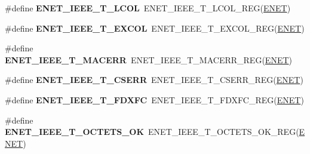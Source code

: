 \begin{DoxyCompactItemize}
\item 
\#define {\bfseries E\+N\+E\+T\+\_\+\+I\+E\+E\+E\+\_\+\+T\+\_\+\+L\+C\+OL}~E\+N\+E\+T\+\_\+\+I\+E\+E\+E\+\_\+\+T\+\_\+\+L\+C\+O\+L\+\_\+\+R\+EG(\hyperlink{group__ENET__Peripheral__Access__Layer_ga4745105f505f3ab949d6a57fbe2a0ed5}{E\+N\+ET})\hypertarget{group__ENET__Register__Accessor__Macros_ga910889e1ce4ca3cb9c3cb3cca360c9a9}{}\label{group__ENET__Register__Accessor__Macros_ga910889e1ce4ca3cb9c3cb3cca360c9a9}

\item 
\#define {\bfseries E\+N\+E\+T\+\_\+\+I\+E\+E\+E\+\_\+\+T\+\_\+\+E\+X\+C\+OL}~E\+N\+E\+T\+\_\+\+I\+E\+E\+E\+\_\+\+T\+\_\+\+E\+X\+C\+O\+L\+\_\+\+R\+EG(\hyperlink{group__ENET__Peripheral__Access__Layer_ga4745105f505f3ab949d6a57fbe2a0ed5}{E\+N\+ET})\hypertarget{group__ENET__Register__Accessor__Macros_gac4beb3a2331f2a6497df362de43e3072}{}\label{group__ENET__Register__Accessor__Macros_gac4beb3a2331f2a6497df362de43e3072}

\item 
\#define {\bfseries E\+N\+E\+T\+\_\+\+I\+E\+E\+E\+\_\+\+T\+\_\+\+M\+A\+C\+E\+RR}~E\+N\+E\+T\+\_\+\+I\+E\+E\+E\+\_\+\+T\+\_\+\+M\+A\+C\+E\+R\+R\+\_\+\+R\+EG(\hyperlink{group__ENET__Peripheral__Access__Layer_ga4745105f505f3ab949d6a57fbe2a0ed5}{E\+N\+ET})\hypertarget{group__ENET__Register__Accessor__Macros_ga38b6b791435ad388824e6a0a20637452}{}\label{group__ENET__Register__Accessor__Macros_ga38b6b791435ad388824e6a0a20637452}

\item 
\#define {\bfseries E\+N\+E\+T\+\_\+\+I\+E\+E\+E\+\_\+\+T\+\_\+\+C\+S\+E\+RR}~E\+N\+E\+T\+\_\+\+I\+E\+E\+E\+\_\+\+T\+\_\+\+C\+S\+E\+R\+R\+\_\+\+R\+EG(\hyperlink{group__ENET__Peripheral__Access__Layer_ga4745105f505f3ab949d6a57fbe2a0ed5}{E\+N\+ET})\hypertarget{group__ENET__Register__Accessor__Macros_ga21185b524641acfbeb1f2c5f1c7231bc}{}\label{group__ENET__Register__Accessor__Macros_ga21185b524641acfbeb1f2c5f1c7231bc}

\item 
\#define {\bfseries E\+N\+E\+T\+\_\+\+I\+E\+E\+E\+\_\+\+T\+\_\+\+F\+D\+X\+FC}~E\+N\+E\+T\+\_\+\+I\+E\+E\+E\+\_\+\+T\+\_\+\+F\+D\+X\+F\+C\+\_\+\+R\+EG(\hyperlink{group__ENET__Peripheral__Access__Layer_ga4745105f505f3ab949d6a57fbe2a0ed5}{E\+N\+ET})\hypertarget{group__ENET__Register__Accessor__Macros_ga3816e7205f62c6b5a14dd88ef4cc0363}{}\label{group__ENET__Register__Accessor__Macros_ga3816e7205f62c6b5a14dd88ef4cc0363}

\item 
\#define {\bfseries E\+N\+E\+T\+\_\+\+I\+E\+E\+E\+\_\+\+T\+\_\+\+O\+C\+T\+E\+T\+S\+\_\+\+OK}~E\+N\+E\+T\+\_\+\+I\+E\+E\+E\+\_\+\+T\+\_\+\+O\+C\+T\+E\+T\+S\+\_\+\+O\+K\+\_\+\+R\+EG(\hyperlink{group__ENET__Peripheral__Access__Layer_ga4745105f505f3ab949d6a57fbe2a0ed5}{E\+N\+ET})\hypertarget{group__ENET__Register__Accessor__Macros_ga3cae3e7cfe281844ec9bac51afdba9f0}{}\label{group__ENET__Register__Accessor__Macros_ga3cae3e7cfe281844ec9bac51afdba9f0}


\end{DoxyCompactItemize}

